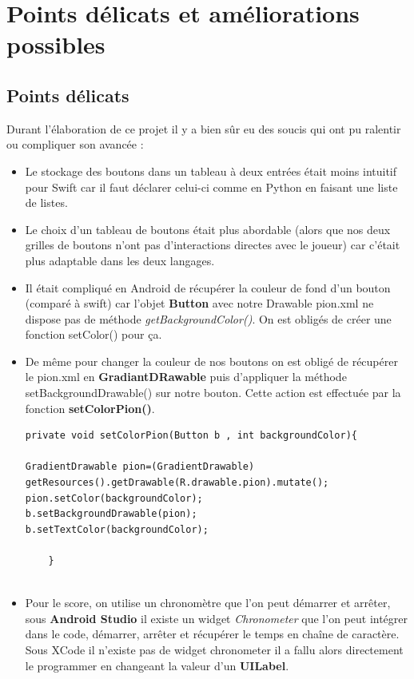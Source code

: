\documentclass{article}
\begin{document}
\section{Points délicats et améliorations possibles}
\subsection{Points délicats}

Durant l'élaboration de ce projet il y a bien sûr eu des soucis qui ont pu ralentir ou compliquer son avancée : 

\begin{itemize}
\item Le stockage des boutons dans un tableau à deux entrées était moins intuitif pour Swift car il faut déclarer celui-ci comme en Python en faisant une liste de listes.
\item Le choix d'un tableau de boutons était plus abordable (alors que nos deux grilles de boutons n'ont pas d’interactions directes avec le joueur) car c’était plus adaptable dans les deux langages. 
\item Il était compliqué en Android de récupérer la couleur de fond d'un bouton (comparé à swift) car l'objet \textbf{Button} avec notre Drawable pion.xml ne dispose pas de méthode \textit{getBackgroundColor()}. On est obligés de créer une fonction setColor() pour ça.
\item De même pour changer la couleur de nos boutons on est obligé de récupérer le pion.xml en \textbf{GradiantDRawable} puis d'appliquer la méthode setBackgroundDrawable() sur notre bouton. Cette action est effectuée par la fonction \textbf{setColorPion()}.

\begin{verbatim}
private void setColorPion(Button b , int backgroundColor){

GradientDrawable pion=(GradientDrawable) getResources().getDrawable(R.drawable.pion).mutate();
pion.setColor(backgroundColor);
b.setBackgroundDrawable(pion);
b.setTextColor(backgroundColor);

    }
    
\end{verbatim}

\item Pour le score, on utilise un chronomètre que l'on peut démarrer et arrêter, sous \textbf{Android Studio} il existe un widget \textit{Chronometer} que l'on peut intégrer dans le code, démarrer, arrêter et récupérer le temps en chaîne de caractère. Sous XCode il n'existe pas de widget chronometer il a fallu alors directement le programmer en changeant la valeur d'un \textbf{UILabel}.  
\end{itemize}
\end{document}
